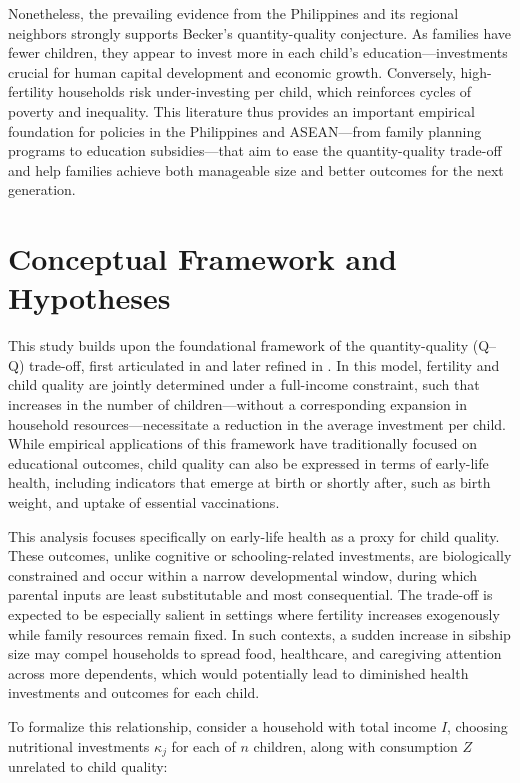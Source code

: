 \documentclass[]{AEA}
\begin{document}
Nonetheless, the prevailing evidence from the Philippines and its
regional neighbors strongly supports Becker's quantity-quality
conjecture. As families have fewer children, they appear to invest more
in each child's education---investments crucial for human capital
development and economic growth. Conversely, high-fertility households
risk under-investing per child, which reinforces cycles of poverty and
inequality. This literature thus provides an important empirical
foundation for policies in the Philippines and ASEAN---from family
planning programs to education subsidies---that aim to ease the
quantity-quality trade-off and help families achieve both manageable
size and better outcomes for the next generation.

\section{Conceptual Framework and Hypotheses}

This study builds upon the foundational framework of the
quantity-quality (Q--Q) trade-off, first articulated in
\citet{becker1960economic} and later refined in
\citet{becker1973interaction}. In this model, fertility and child
quality are jointly determined under a full-income constraint, such that
increases in the number of children---without a corresponding expansion
in household resources---necessitate a reduction in the average
investment per child. While empirical applications of this framework
have traditionally focused on educational outcomes, child quality can
also be expressed in terms of early-life health, including indicators
that emerge at birth or shortly after, such as birth weight, and uptake
of essential vaccinations.

This analysis focuses specifically on early-life health as a proxy for
child quality. These outcomes, unlike cognitive or schooling-related
investments, are biologically constrained and occur within a narrow
developmental window, during which parental inputs are least
substitutable and most consequential. The trade-off is expected to be
especially salient in settings where fertility increases exogenously
while family resources remain fixed. In such contexts, a sudden increase
in sibship size may compel households to spread food, healthcare, and
caregiving attention across more dependents, which would potentially
lead to diminished health investments and outcomes for each child.

To formalize this relationship, consider a household with total income
\(I\), choosing nutritional investments \(\kappa_j\) for each of \(n\)
children, along with consumption \(Z\) unrelated to child quality:
\end{document}

